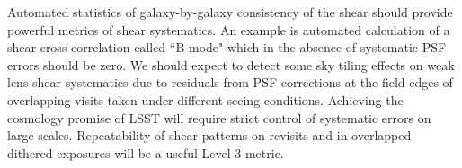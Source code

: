 \documentclass[SE,toc]{lsstdoc}
\begin{document}
Automated statistics of galaxy-by-galaxy consistency of the shear should provide powerful metrics of shear systematics.  An example is automated calculation of a shear cross correlation called ``B-mode" which in the absence of systematic PSF errors should be zero. We should expect to detect some sky tiling effects on weak lens shear systematics due to residuals from PSF corrections at the field edges of overlapping visits taken under different seeing conditions. Achieving the cosmology promise of LSST will require strict control of systematic errors on large scales. Repeatability of shear patterns on revisits and in overlapped dithered exposures will be a useful Level 3 metric.
\end{document}
